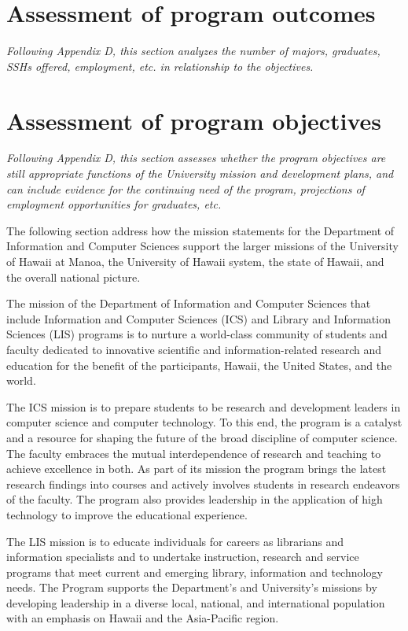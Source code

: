\documentclass[12pt]{article}
\begin{document}
\section{Assessment of program outcomes}

{\em Following Appendix D, this section analyzes the number of majors,
  graduates, SSHs offered, employment, etc. in relationship to the
  objectives.}


\section{Assessment of program objectives}

{\em Following Appendix D, this section assesses whether the program
  objectives are still appropriate functions of the University mission and
  development plans, and can include evidence for the continuing need of
  the program, projections of employment opportunities for graduates, etc.}

The following section address how the mission statements for the Department
of Information and Computer Sciences support the larger missions of the
University of Hawaii at Manoa, the University of Hawaii system, the state
of Hawaii, and the overall national picture.

The mission of the Department of Information and Computer Sciences that
include Information and Computer Sciences (ICS) and Library and Information
Sciences (LIS) programs is to nurture a world-class community of students
and faculty dedicated to innovative scientific and information-related
research and education for the benefit of the participants, Hawaii, the
United States, and the world. 

The ICS mission is to prepare students to be research and development
leaders in computer science and computer technology. To this end, the
program is a catalyst and a resource for shaping the future of the broad
discipline of computer science. The faculty embraces the mutual
interdependence of research and teaching to achieve excellence in both. As
part of its mission the program brings the latest research findings into
courses and actively involves students in research endeavors of the
faculty. The program also provides leadership in the application of high
technology to improve the educational experience.

The LIS mission is to educate individuals for careers as librarians and
information specialists and to undertake instruction, research and service
programs that meet current and emerging library, information and technology
needs.  The Program supports the Department's and University's missions by
developing leadership in a diverse local, national, and international
population with an emphasis on Hawaii and the Asia-Pacific region.
\end{document}
